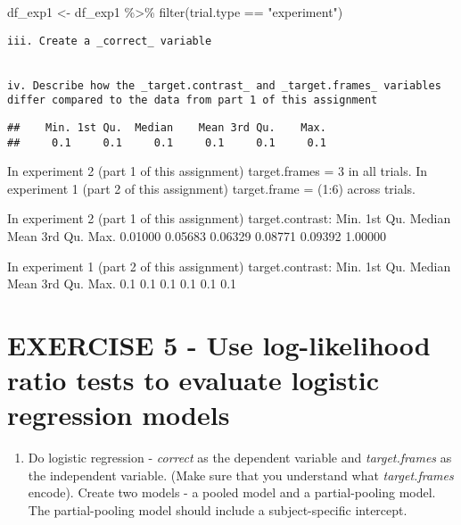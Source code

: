 \documentclass[
]{article}
\newenvironment{Shaded}{\begin{snugshade}}{\end{snugshade}}
\newcommand{\FunctionTok}[1]{\textcolor[rgb]{0.00,0.00,0.00}{#1}}
\newcommand{\NormalTok}[1]{#1}
\newcommand{\OtherTok}[1]{\textcolor[rgb]{0.56,0.35,0.01}{#1}}
\newcommand{\SpecialCharTok}[1]{\textcolor[rgb]{0.00,0.00,0.00}{#1}}
\newcommand{\StringTok}[1]{\textcolor[rgb]{0.31,0.60,0.02}{#1}}
\providecommand{\tightlist}{%
  \setlength{\itemsep}{0pt}\setlength{\parskip}{0pt}}
\begin{document}
\begin{Shaded}
\begin{Highlighting}[]
\NormalTok{df\_exp1 }\OtherTok{\textless{}{-}}\NormalTok{ df\_exp1 }\SpecialCharTok{\%\textgreater{}\%} 
  \FunctionTok{filter}\NormalTok{(trial.type }\SpecialCharTok{==} \StringTok{"experiment"}\NormalTok{)}
\end{Highlighting}
\end{Shaded}

\begin{verbatim}
iii. Create a _correct_ variable  


iv. Describe how the _target.contrast_ and _target.frames_ variables differ compared to the data from part 1 of this assignment  
\end{verbatim}

\begin{verbatim}
##    Min. 1st Qu.  Median    Mean 3rd Qu.    Max. 
##     0.1     0.1     0.1     0.1     0.1     0.1
\end{verbatim}

In experiment 2 (part 1 of this assignment) target.frames = 3 in all
trials. In experiment 1 (part 2 of this assignment) target.frame = (1:6)
across trials.

In experiment 2 (part 1 of this assignment) target.contrast: Min. 1st
Qu. Median Mean 3rd Qu. Max. 0.01000 0.05683 0.06329 0.08771 0.09392
1.00000

In experiment 1 (part 2 of this assignment) target.contrast: Min. 1st
Qu. Median Mean 3rd Qu. Max. 0.1 0.1 0.1 0.1 0.1 0.1

\hypertarget{exercise-5---use-log-likelihood-ratio-tests-to-evaluate-logistic-regression-models}{%
\section{EXERCISE 5 - Use log-likelihood ratio tests to evaluate
logistic regression
models}\label{exercise-5---use-log-likelihood-ratio-tests-to-evaluate-logistic-regression-models}}

\begin{enumerate}
\def\labelenumi{\arabic{enumi})}
\tightlist
\item
  Do logistic regression - \emph{correct} as the dependent variable and
  \emph{target.frames} as the independent variable. (Make sure that you
  understand what \emph{target.frames} encode). Create two models - a
  pooled model and a partial-pooling model. The partial-pooling model
  should include a subject-specific intercept.
\end{enumerate}
\end{document}
